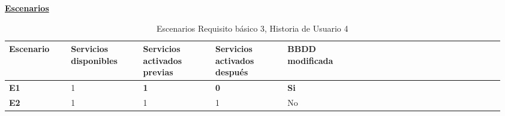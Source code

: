 \documentclass[../ei103948-project-documentation.tex]{subfiles}
\begin{document}
					\begin{center}
						\textbf{\underline{Escenarios}}
						\begin{table}[H]
							\centering
							\begin{tabular}{|p{0.12\linewidth}|p{0.14\linewidth}|p{0.14\linewidth}|p{0.14\linewidth}|p{0.14\linewidth}|p{0.14\linewidth}|p{0.14\linewidth}|}
								\hline
								\textbf{Escenario} & \textbf{Servicios disponibles} & \textbf{Servicios activados previas} & \textbf{Servicios activados después} & \textbf{BBDD modificada} \\ \hline
								\textbf{E1}        & 1                              & \textbf{1}                           & \textbf{0}                           & \textbf{Si}              \\ \hline
								\textbf{E2}        & 1                              & 1                                    & 1                                    & No                       \\ \hline
								\end{tabular}
							\caption{Escenarios Requisito básico 3, Historia de Usuario 4}
						\end{table}
					
						\newpage

						\descripcionBasicaX


\end{center}
\end{document}
